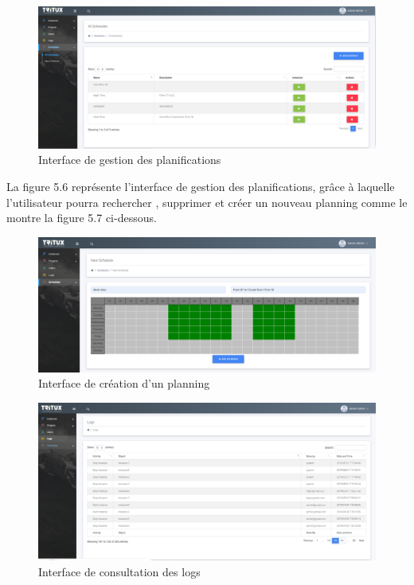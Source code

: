 \begin{figure}[H]
	\centering
	\includegraphics[scale=0.35]{schedules.PNG}
	\caption{Interface de gestion des planifications}
	\label{Interface de gestion des planifications}
\end{figure}
La figure 5.6 représente l'interface de gestion des planifications, grâce à laquelle l'utilisateur
pourra rechercher , supprimer  et  créer un nouveau planning comme le montre la figure 5.7 ci-dessous. 
\newline
\begin{figure}[H]
	\centering
	\includegraphics[scale=0.35]{creerschedule.PNG}
	\caption{Interface de création d'un planning}
	\label{Interface de création d'un planning}
\end{figure}
\begin{figure}[H]
	\centering
	\includegraphics[scale=0.35]{logs.PNG}
	\caption{Interface de consultation des logs }
	\label{Interface de consultation des logs}
\end{figure}

